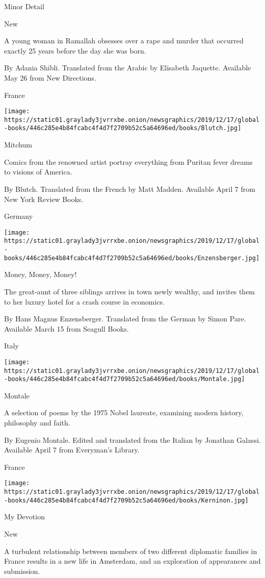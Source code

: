 Minor Detail

New

A young woman in Ramallah obsesses over a rape and murder that occurred
exactly 25 years before the day she was born.

 By Adania Shibli. Translated from the Arabic by Elisabeth Jaquette.
Available May 26 from New Directions.

France

\texttt{[image: https://static01.graylady3jvrrxbe.onion/newsgraphics/2019/12/17/global-books/446c285e4b84fcabc4f4d7f2709b52c5a64696ed/books/Blutch.jpg]}

Mitchum

Comics from the renowned artist portray everything from Puritan fever
dreams to visions of America.

 By Blutch. Translated from the French by Matt Madden. Available April 7
from New York Review Books.

Germany

\texttt{[image: https://static01.graylady3jvrrxbe.onion/newsgraphics/2019/12/17/global-books/446c285e4b84fcabc4f4d7f2709b52c5a64696ed/books/Enzensberger.jpg]}

Money, Money, Money!

The great-aunt of three siblings arrives in town newly wealthy, and
invites them to her luxury hotel for a crash course in economics.

 By Hans Magnus Enzensberger. Translated from the German by Simon Pare.
Available March 15 from Seagull Books.

Italy

\texttt{[image: https://static01.graylady3jvrrxbe.onion/newsgraphics/2019/12/17/global-books/446c285e4b84fcabc4f4d7f2709b52c5a64696ed/books/Montale.jpg]}

Montale

A selection of poems by the 1975 Nobel laureate, examining modern
history, philosophy and faith.

 By Eugenio Montale. Edited and translated from the Italian by Jonathan
Galassi. Available April 7 from Everyman's Library.

France

\texttt{[image: https://static01.graylady3jvrrxbe.onion/newsgraphics/2019/12/17/global-books/446c285e4b84fcabc4f4d7f2709b52c5a64696ed/books/Kerninon.jpg]}

My Devotion

New

A turbulent relationship between members of two different diplomatic
families in France results in a new life in Amsterdam, and an
exploration of appearances and submission.

